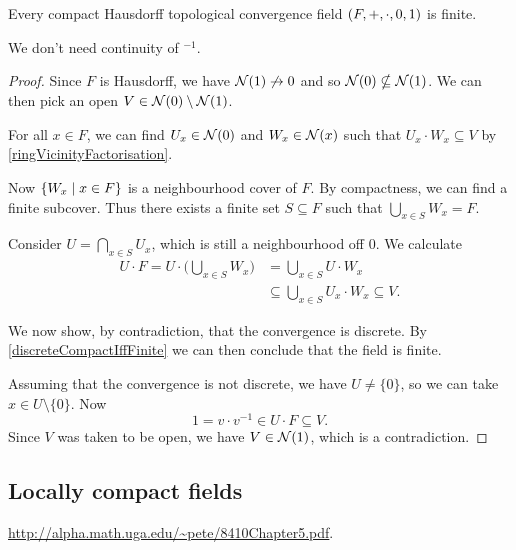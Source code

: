 \begin{proposition} \label{compactT2TopologicalFieldFinite}
Every compact Hausdorff topological convergence field $\sSet{F,+,\cdot, 0,1}$ is finite.
\end{proposition}
We don't need continuity of ${}^{-1}$.
\begin{proof}
Since $F$ is Hausdorff, we have $\operatorname{\mathcal{N}}(1)\not\to 0$ and so $\operatorname{\mathcal{N}}(0) \nsubseteq \operatorname{\mathcal{N}}(1)$. We can then pick an open $V\in \operatorname{\mathcal{N}}(0) \setminus \operatorname{\mathcal{N}}(1)$.

For all $x\in F$, we can find $U_x\in \operatorname{\mathcal{N}}(0)$ and $W_x\in \operatorname{\mathcal{N}}(x)$ such that $U_x\cdot W_x \subseteq V$ by \ref{ringVicinityFactorisation}.

Now $\setbuilder{W_x}{x\in F}$ is a neighbourhood cover of $F$. By compactness, we can find a finite subcover. Thus there exists a finite set $S\subseteq F$ such that $\bigcup_{x\in S}W_x = F$.

Consider $U = \bigcap_{x\in S}U_x$, which is still a neighbourhood off $0$. We calculate
\begin{align*}
U\cdot F = U\cdot \Big(\bigcup_{x\in S}W_x\Big) &= \bigcup_{x\in S} U\cdot W_x \\
&\subseteq \bigcup_{x\in S} U_x\cdot W_x \subseteq V.
\end{align*}

We now show, by contradiction, that the convergence is discrete. By \ref{discreteCompactIffFinite} we can then conclude that the field is finite.

Assuming that the convergence is not discrete, we have $U \neq \{0\}$, so we can take $x\in U\setminus\{0\}$. Now
\[ 1 = v\cdot v^{-1} \in U\cdot F \subseteq V. \]
Since $V$ was taken to be open, we have $V\in \operatorname{\mathcal{N}}(1)$, which is a contradiction.
\end{proof}

\subsection{Locally compact fields}

\url{http://alpha.math.uga.edu/~pete/8410Chapter5.pdf}.
